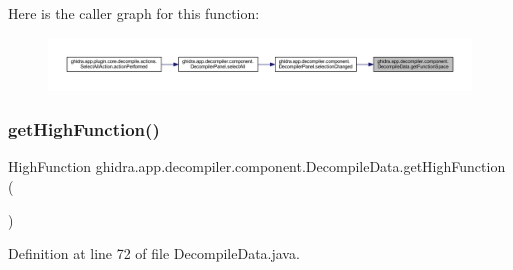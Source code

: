 Here is the caller graph for this function\+:
\nopagebreak
\begin{figure}[H]
\begin{center}
\leavevmode
\includegraphics[width=350pt]{classghidra_1_1app_1_1decompiler_1_1component_1_1_decompile_data_a615d95992bf1abc8bee6b75cd6c0f663_icgraph}
\end{center}
\end{figure}
\mbox{\label{classghidra_1_1app_1_1decompiler_1_1component_1_1_decompile_data_a9a68b970260d588ab262e60a5d252a5e}} 
\subsubsection{\texorpdfstring{getHighFunction()}{getHighFunction()}}
{\footnotesize\ttfamily High\+Function ghidra.\+app.\+decompiler.\+component.\+Decompile\+Data.\+get\+High\+Function (\begin{DoxyParamCaption}{ }\end{DoxyParamCaption})\hspace{0.3cm}{\ttfamily [inline]}}



Definition at line 72 of file Decompile\+Data.\+java.

